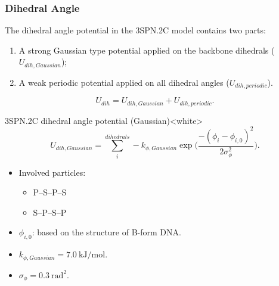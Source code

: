 \subsubsection{Dihedral Angle}
\label{sec:dna_3spn2c_potential_dihedral_angle}

The dihedral angle potential in the 3SPN.2C model contains two parts:
\begin{enumerate}
\item A strong Gaussian type potential applied on the backbone dihedrals
  ($U_{dih, Gaussian}$);
\item A weak periodic potential applied on all dihedral angles ($U_{dih, periodic}$).
\end{enumerate}
\begin{equation}
  \label{eq:dna_3spn2c_local_dihedral}
  U_{dih} = U_{dih, Gaussian} + U_{dih, periodic}.
\end{equation}

\begin{smallpage}{3SPN.2C dihedral angle potential (Gaussian)}<white>
  \begin{equation}
    \label{eq:dna_3spn2c_local_dihedral_Gaussian}
    U_{dih, Gaussian} = \sum_{i}^{dihedrals} -k_{ \phi, Gaussian } \exp\big( \frac{-(\phi_i - \phi_{i,0})^2}{2\sigma_{\phi}^2} \big).
  \end{equation}
  \tcblower
  \begin{itemize}
  \item Involved particles:
    \begin{itemize}
    \item P--S--P--S
    \item S--P--S--P
    \end{itemize}
  \item $\phi_{i, 0}$: based on the structure of B-form DNA.
  \item $k_{\phi, Gaussian} = 7.0\ \mathrm{kJ/mol}$.
  \item $\sigma_\phi = 0.3\ \mathrm{rad^2}$.
  \end{itemize}
\end{smallpage}

